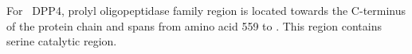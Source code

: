 For~ DPP4, prolyl oligopeptidase family region is located towards the C-terminus of the protein chain and spans from amino acid 559 to . This region contains serine catalytic region.  